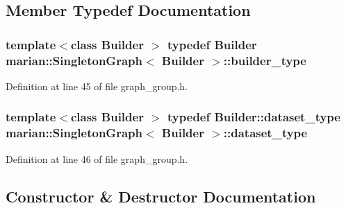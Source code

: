 \subsection{Member Typedef Documentation}
\subsubsection[{\texorpdfstring{builder\+\_\+type}{builder_type}}]{\setlength{\rightskip}{0pt plus 5cm}template$<$class Builder $>$ typedef Builder {\bf marian\+::\+Singleton\+Graph}$<$ Builder $>$\+::{\bf builder\+\_\+type}}\hypertarget{classmarian_1_1SingletonGraph_aa1976dc1eff06ae05814084160b1cd3e}{}\label{classmarian_1_1SingletonGraph_aa1976dc1eff06ae05814084160b1cd3e}


Definition at line 45 of file graph\+\_\+group.\+h.

\subsubsection[{\texorpdfstring{dataset\+\_\+type}{dataset_type}}]{\setlength{\rightskip}{0pt plus 5cm}template$<$class Builder $>$ typedef Builder\+::dataset\+\_\+type {\bf marian\+::\+Singleton\+Graph}$<$ Builder $>$\+::{\bf dataset\+\_\+type}}\hypertarget{classmarian_1_1SingletonGraph_a6bb5603e1b8641cd65bd7b032cbecefd}{}\label{classmarian_1_1SingletonGraph_a6bb5603e1b8641cd65bd7b032cbecefd}


Definition at line 46 of file graph\+\_\+group.\+h.



\subsection{Constructor \& Destructor Documentation}
